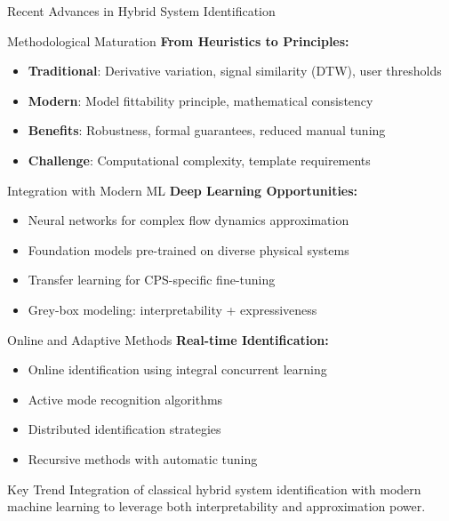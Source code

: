 \documentclass[aspectratio=169]{beamer}
\begin{document}
\begin{frame}{Recent Advances in Hybrid System Identification}
\begin{block}{Methodological Maturation}
\textbf{From Heuristics to Principles:}
\begin{itemize}
\item \textbf{Traditional}: Derivative variation, signal similarity (DTW), user thresholds
\item \textbf{Modern}: Model fittability principle, mathematical consistency
\item \textbf{Benefits}: Robustness, formal guarantees, reduced manual tuning
\item \textbf{Challenge}: Computational complexity, template requirements
\end{itemize}
\end{block}

\begin{block}{Integration with Modern ML}
\textbf{Deep Learning Opportunities:}
\begin{itemize}
\item Neural networks for complex flow dynamics approximation
\item Foundation models pre-trained on diverse physical systems
\item Transfer learning for CPS-specific fine-tuning
\item Grey-box modeling: interpretability + expressiveness
\end{itemize}
\end{block}

\begin{block}{Online and Adaptive Methods}
\textbf{Real-time Identification:}
\begin{itemize}
\item Online identification using integral concurrent learning \cite{yang2021online}
\item Active mode recognition algorithms
\item Distributed identification strategies \cite{chen2021piecewise}
\item Recursive methods with automatic tuning
\end{itemize}
\end{block}

\begin{alertblock}{Key Trend}
Integration of classical hybrid system identification with modern machine learning to leverage both interpretability and approximation power.
\end{alertblock}
\end{frame}
\end{document}
